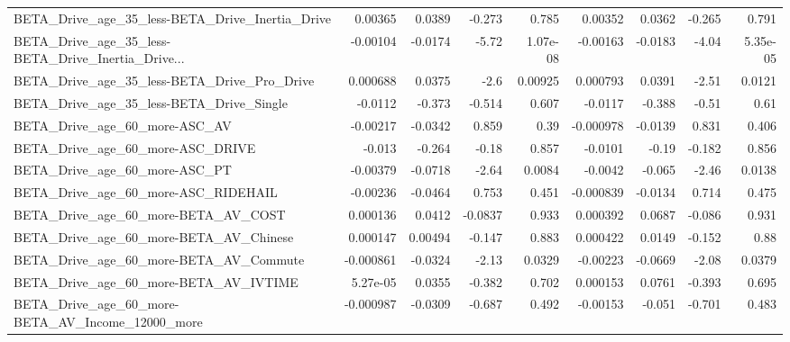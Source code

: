 \begin{tabular}{lrrrrrrrr}
BETA\_Drive\_age\_35\_less-BETA\_Drive\_Inertia\_Drive    &     0.00365 &       0.0389 &   -0.273 &    0.785 &    0.00352 &      0.0362 &       -0.265 &         0.791 \\
BETA\_Drive\_age\_35\_less-BETA\_Drive\_Inertia\_Drive... &    -0.00104 &      -0.0174 &    -5.72 & 1.07e-08 &   -0.00163 &     -0.0183 &        -4.04 &      5.35e-05 \\
BETA\_Drive\_age\_35\_less-BETA\_Drive\_Pro\_Drive        &    0.000688 &       0.0375 &     -2.6 &  0.00925 &   0.000793 &      0.0391 &        -2.51 &        0.0121 \\
BETA\_Drive\_age\_35\_less-BETA\_Drive\_Single           &     -0.0112 &       -0.373 &   -0.514 &    0.607 &    -0.0117 &      -0.388 &        -0.51 &          0.61 \\
BETA\_Drive\_age\_60\_more-ASC\_AV                      &    -0.00217 &      -0.0342 &    0.859 &     0.39 &  -0.000978 &     -0.0139 &        0.831 &         0.406 \\
BETA\_Drive\_age\_60\_more-ASC\_DRIVE                   &      -0.013 &       -0.264 &    -0.18 &    0.857 &    -0.0101 &       -0.19 &       -0.182 &         0.856 \\
BETA\_Drive\_age\_60\_more-ASC\_PT                      &    -0.00379 &      -0.0718 &    -2.64 &   0.0084 &    -0.0042 &      -0.065 &        -2.46 &        0.0138 \\
BETA\_Drive\_age\_60\_more-ASC\_RIDEHAIL                &    -0.00236 &      -0.0464 &    0.753 &    0.451 &  -0.000839 &     -0.0134 &        0.714 &         0.475 \\
BETA\_Drive\_age\_60\_more-BETA\_AV\_COST                &    0.000136 &       0.0412 &  -0.0837 &    0.933 &   0.000392 &      0.0687 &       -0.086 &         0.931 \\
BETA\_Drive\_age\_60\_more-BETA\_AV\_Chinese             &    0.000147 &      0.00494 &   -0.147 &    0.883 &   0.000422 &      0.0149 &       -0.152 &          0.88 \\
BETA\_Drive\_age\_60\_more-BETA\_AV\_Commute             &   -0.000861 &      -0.0324 &    -2.13 &   0.0329 &   -0.00223 &     -0.0669 &        -2.08 &        0.0379 \\
BETA\_Drive\_age\_60\_more-BETA\_AV\_IVTIME              &    5.27e-05 &       0.0355 &   -0.382 &    0.702 &   0.000153 &      0.0761 &       -0.393 &         0.695 \\
BETA\_Drive\_age\_60\_more-BETA\_AV\_Income\_12000\_more   &   -0.000987 &      -0.0309 &   -0.687 &    0.492 &   -0.00153 &      -0.051 &       -0.701 &         0.483 \\

\end{tabular}

